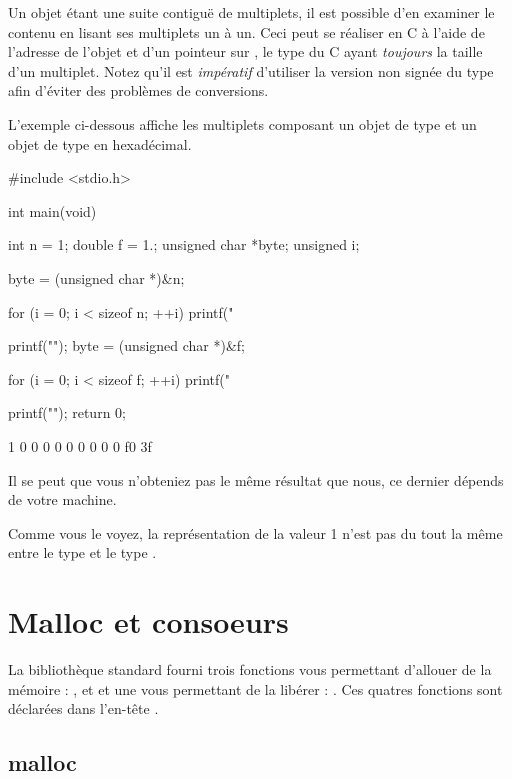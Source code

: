 Un objet étant une suite contiguë de multiplets, il est possible d'en
examiner le contenu en lisant ses multiplets un à un. Ceci peut se
réaliser en C à l'aide de l'adresse de l'objet et d'un pointeur sur
, le type  du C ayant
\emph{toujours} la taille d'un multiplet. Notez qu'il est
\emph{impératif} d'utiliser la version non signée du type 
afin d'éviter des problèmes de conversions.

L'exemple ci-dessous affiche les multiplets composant un objet de type
 et un objet de type  en hexadécimal.

\begin{C}
#include <stdio.h>


int main(void)
{
    int n = 1;
    double f = 1.;
    unsigned char *byte;
    unsigned i;

    byte = (unsigned char *)&n;

    for (i = 0; i < sizeof n; ++i)
        printf("%

    printf("\n");
    byte = (unsigned char *)&f;

    for (i = 0; i < sizeof f; ++i)
        printf("%

    printf("\n");
    return 0;
}
\end{C}

\begin{C}
1 0 0 0 
0 0 0 0 0 0 f0 3f 
\end{C}

\begin{infobox}
Il se peut que vous n'obteniez pas le
même résultat que nous, ce dernier dépends de votre machine.
\end{infobox}

Comme vous le voyez, la représentation de la valeur 1 n'est pas du tout
la même entre le type  et le type .

\section{Malloc et consoeurs}
\label{malloc-et-consoeurs}

La bibliothèque standard fourni trois fonctions vous permettant d'allouer 
de la mémoire : ,  et  et 
une vous permettant de la libérer : . Ces quatres fonctions 
sont déclarées dans l'en-tête .

\subsection{malloc}
\label{malloc}

